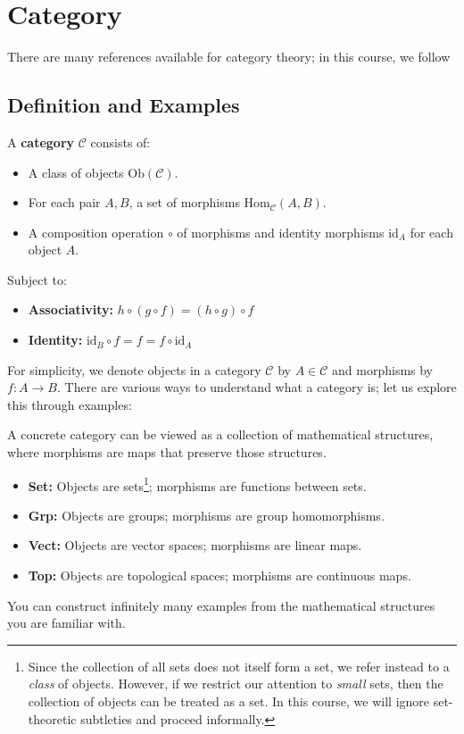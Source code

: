 \chapter{Category}\label{chap:category} 

There are many references available for category theory; in this course, we follow \cite{nlab:geometry_of_physics_--_categories_and_toposes}
\section{Definition and Examples}
\begin{definition}[Category]
A \textbf{category} $\mathcal{C}$ consists of:
\begin{itemize}
  \item A class of objects $\mathrm{Ob}(\mathcal{C})$.
    \item For each pair $A, B$, a set of morphisms $\mathrm{Hom}_{\mathcal{C}}(A, B)$.
    \item A composition operation $\circ$ of morphisms and identity morphisms $\mathrm{id}_A$ for each object $A$.
\end{itemize}

Subject to:
\begin{itemize}
    \item \textbf{Associativity:} $h \circ (g \circ f) = (h \circ g) \circ f$
    \item \textbf{Identity:} $\mathrm{id}_B \circ f = f = f \circ \mathrm{id}_A$
\end{itemize}
 
\end{definition}

For simplicity, we denote objects in a category $\mathcal{C}$ by $A \in \mathcal{C}$ and morphisms by $f: A \to B$. There are various ways to understand what a category is; let us explore this through examples:

\begin{example}
A concrete category can be viewed as a collection of mathematical structures, where morphisms are maps that preserve those structures.
\begin{itemize}
  \item \textbf{Set:} Objects are sets\footnote{Since the collection of all sets does not itself form a set, we refer instead to a \emph{class} of objects. However, if we restrict our attention to \emph{small} sets, then the collection of objects can be treated as a set. In this course, we will ignore set-theoretic subtleties and proceed informally.}; morphisms are functions between sets.
    \item \textbf{Grp:} Objects are groups; morphisms are group homomorphisms.
    \item \textbf{Vect:} Objects are vector spaces; morphisms are linear maps.
    \item \textbf{Top:} Objects are topological spaces; morphisms are continuous maps.
\end{itemize}
You can construct infinitely many examples from the mathematical structures you are familiar with.
\end{example}

